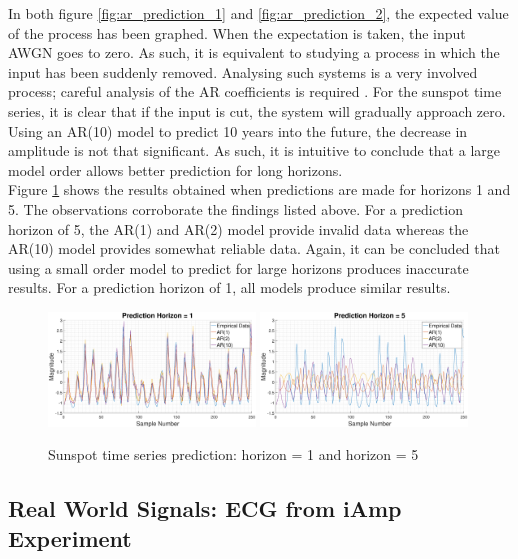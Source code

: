\documentclass{article}
\begin{document}
In both figure \ref{fig:ar_prediction_1} and \ref{fig:ar_prediction_2}, the expected value of the process has been graphed. When the expectation is taken, the input AWGN goes to zero. As such, it is equivalent to studying a process in which the input has been suddenly removed. Analysing such systems is a very involved process; careful analysis of the AR coefficients is required \cite{mandic}. For the sunspot time series, it is clear that if the input is cut, the system will gradually approach zero. Using an AR(10) model to predict 10 years into the future, the decrease in amplitude is not that significant. As such, it is intuitive to conclude that a large model order allows better prediction for long horizons.\\

Figure \ref{fig:ar_prediction_3} shows the results obtained when predictions are made for horizons 1 and 5. The observations corroborate the findings listed above. For a prediction horizon of 5, the AR(1) and AR(2) model provide invalid data whereas the AR(10) model provides somewhat reliable data. Again, it can be concluded that using a small order model to predict for large horizons produces inaccurate results. For a prediction horizon of 1, all models produce similar results. 


\begin{figure}[H]
    \centering
    \includegraphics[width = 0.49\textwidth]{sunspot_prediction_horizon_1}
    \includegraphics[width = 0.49\textwidth]{sunspot_prediction_horizon_5}
    \caption{Sunspot time series prediction: horizon = 1 and horizon = 5}
    \label{fig:ar_prediction_3}
\end{figure}

\subsection{Real World Signals: ECG from iAmp Experiment}
\end{document}
